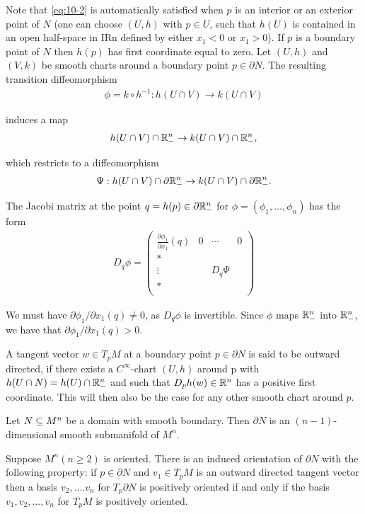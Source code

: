 Note that \eqref{eq:10-2} is automatically satisfied when $p$ is an interior or an exterior point
of $N$ (one can choose $(U, h)$ with $p\in U$, such that $h(U)$ is contained in an open
half-space in IRn defined by either $x_1 < 0$ or $x_1 > 0$). If $p$ is a boundary point of
$N$ then $h(p)$ has first coordinate equal to zero. Let $(U, h)$ and $(V, k)$ be smooth
charts around a boundary point $p\in \partial N$. The resulting transition diffeomorphism
\begin{align*}
  \phi = k\circ h^{-1}: h(U\cap V)\to k(U\cap V)
\end{align*}

induces a map 
\begin{align*}
  h(U\cap V)\cap {\ensuremath{\mathbb{R}}}^n_- \to k(U\cap V)\cap {\ensuremath{\mathbb{R}}}^n_-,
\end{align*}

which restricts to a diffeomorphism
\begin{align*}
  \Psi:h(U\cap V)\cap \partial{\ensuremath{\mathbb{R}}}^n_-\to k(U\cap V)\cap \partial{\ensuremath{\mathbb{R}}}^n_-.
\end{align*}

The Jacobi matrix at the point $q=h(p)\in\partial{\ensuremath{\mathbb{R}}}^n_-$ for $\phi=(\phi_1, \ldots, \phi_n)$ 
has the form 
\begin{align*}
  D_q\phi = \begin{pmatrix}
    \frac{\partial \phi_1}{\partial x_1}(q) & 0 & \cdots & 0\\
    * \\
    \vdots & & D_q\Psi & \\
    * \\
  \end{pmatrix}
\end{align*}

We must have $\partial\phi_1/\partial x_1(q)\neq 0$, as $D_q\phi$ is invertible. Since $\phi$ maps 
${\mathbb{R}}^n_-$ into ${\mathbb{R}}^n_-$, we have that $\partial\phi_1/\partial x_1(q)>0$.

A tangent vector $w\in T_pM$ at a boundary point $p\in\partial N$ is said to be outward
directed, if there exists a $C^\infty$-chart $(U, h)$ around p with $h(U\cap N) = h(U)\cap{\ensuremath{\mathbb{R}}}^n_-$
and such that $D_ph(w)\in{\ensuremath{\mathbb{R}}}^n$ has a positive first coordinate. This will then also be
the case for any other smooth chart around $p$.

\begin{lemma}\label{lemma:10-6}
  Let $N\subseteq M^n$ be a domain with smooth boundary. Then $\partial N$ is an $(n - 1)$-dimensional 
  smooth submanifold of $M^n$.

  Suppose $M^n (n\ge2)$ is oriented. There is an induced orientation of $\partial N$ with the
  following property: if $p\in\partial N$ and $v_1\in T_pM$ is an outward directed tangent
  vector then a basis $v_2,\ldots.v_n$ for $T_p\partial N$ is positively oriented if and only if 
  the basis $v_1,v_2,\ldots,v_n$ for $T_pM$ is positively oriented.
\end{lemma}

